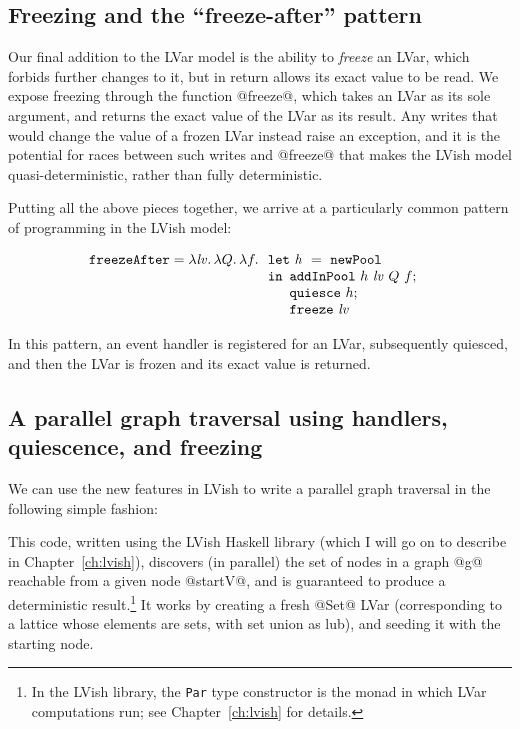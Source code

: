 \subsection{Freezing and the ``freeze-after'' pattern}\label{subsection:quasi-freeze-after}

Our final addition to the LVar model is the ability to \emph{freeze}
an LVar, which forbids further changes to it, but in return allows its
exact value to be read.  We expose freezing through the function
@freeze@, which takes an LVar as its sole argument, and returns the
exact value of the LVar as its result.  Any writes that would change
the value of a frozen LVar instead raise an exception, and it is the
potential for races between such writes and @freeze@ that makes the
LVish model quasi-deterministic, rather than fully deterministic.

Putting all the above pieces together, we arrive at a particularly
common pattern of programming in the LVish model:

\singlespacing
\[
\begin{array}[t]{l}
  \mbox{\texttt{freezeAfter}} = \lambda\mathit{lv}.\,\lambda Q.\,\lambda f.\,
  \begin{array}[t]{l}
    \mbox{\texttt{let}}~\mathit{h}~=~{\mbox{\texttt{newPool}}} \\
    \mbox{\texttt{in}}
      \begin{array}[t]{l}  
        {\mbox{\texttt{addInPool}}}~h~\mathit{lv}~Q~f;
\\
        {\mbox{\texttt{quiesce}}}~h;
\\
        \mbox{\texttt{freeze}}~\mathit{lv}
      \end{array}
  \end{array}
\end{array}
\]
\doublespacing

In this pattern, an event handler is registered for an LVar,
subsequently quiesced, and then the LVar is frozen and its exact value
is returned.

\subsection{A parallel graph traversal using handlers, quiescence, and freezing}\label{subsection:quasi-parallel-graph-traversal}

We can use the new features in LVish to write a parallel graph
traversal in the following simple fashion:

\singlespacing

\doublespacing

This code, written using the LVish Haskell library (which I will go on
to describe in Chapter~\ref{ch:lvish}), discovers (in parallel) the
set of nodes in a graph @g@ reachable from a given node @startV@, and
is guaranteed to produce a deterministic result.\footnote{In the LVish
  library, the \lstinline|Par| type constructor is the monad in which
  LVar computations run; see Chapter~\ref{ch:lvish} for details.}  It
works by creating a fresh @Set@ LVar (corresponding to a lattice whose
elements are sets, with set union as lub), and seeding it with the
starting node.

